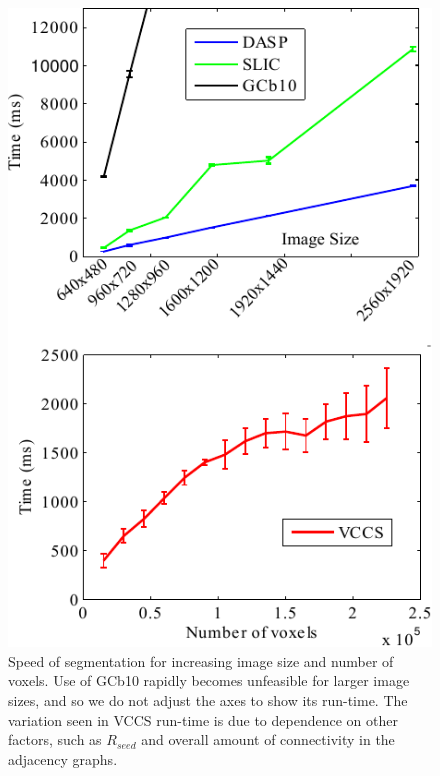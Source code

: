 \begin{figure}[t]
\begin{center}
\includegraphics[width=0.95\linewidth]{figures/CVPR2013/Speed.pdf}
\end{center}
   \caption[Segmentation Speed]{Speed of segmentation for increasing image size and number of voxels. Use of GCb10 rapidly becomes unfeasible for larger image sizes, and so we do not adjust the axes to show its run-time. The variation seen in VCCS run-time is due to dependence on other factors, such as ${R}_{seed}$ and overall amount of connectivity in the adjacency graphs.}
\label{fig:SegmentationSpeed}
\end{figure}




